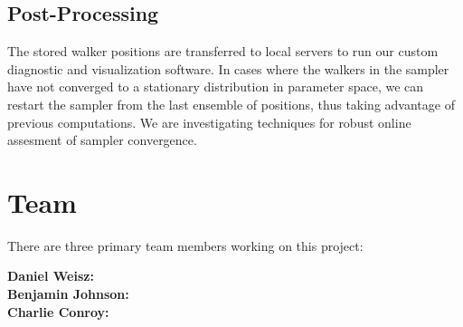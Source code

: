 \documentclass[11pt,preprint]{aastex}
\begin{document}
\subsection{Post-Processing}
The stored walker positions are transferred to local servers to run our custom diagnostic and visualization software.  
In cases where the walkers in the sampler have not converged to a stationary distribution in parameter space, we can restart the sampler from the last ensemble of positions, thus taking advantage of previous computations.  
We are investigating techniques for robust online assesment of sampler convergence.







\clearpage

\section{Team}

There are three primary team members working on this project:

\textbf{Daniel Weisz:} \\

\textbf{Benjamin Johnson:} \\

\textbf{Charlie Conroy:}





\end{document}
